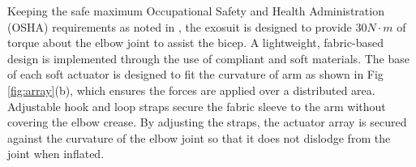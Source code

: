 \documentclass[letterpaper, 10 pt, conference]{ieeeconf}  %
\begin{document}

Keeping the safe maximum Occupational Safety and Health Administration (OSHA) requirements as noted in \cite{waters1994applications}, the exosuit is designed to provide 30$N{\cdot}m$ of torque about the elbow joint to assist the bicep. A lightweight, fabric-based design \cite{Sridar2017} is implemented through the use of compliant and soft materials. The base of each soft actuator is designed to fit the curvature of arm as shown in Fig \ref{fig:array}(b), which ensures the forces are applied over a distributed area. Adjustable hook and loop straps secure the fabric sleeve to the arm without covering the elbow crease. By adjusting the straps, the actuator array is secured against the curvature of the elbow joint so that it does not dislodge from the joint when inflated.



\end{document}
